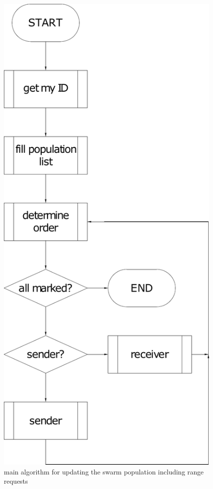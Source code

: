 \documentclass[10pt,a4paper]{article}
\begin{document}
\begin{figure}[H]
   \centering
   \includegraphics[scale=0.5]{mainal.pdf}
   \caption{main algorithm for updating the swarm population including range requests}
   \label{fig:mainal}
\end{figure}
\end{document}
